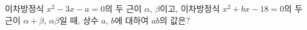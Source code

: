 이차방정식 $x^2-3x-a=0$의 두 근이 $\alpha$, $\beta$이고, 이차방정식 $x^2+bx-18=0$의 두 근이 $\alpha+\beta$, $\alpha\beta$일 때, 상수 $a$, $b$에 대하여 $ab$의 값은?
